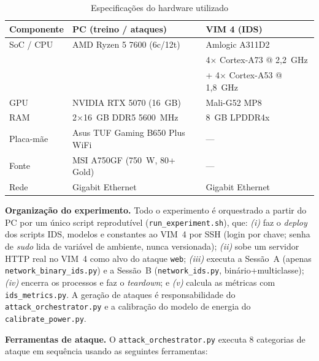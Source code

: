 \documentclass[12pt]{article}
\begin{document}
\begin{table}[ht]
\centering
\caption{Especificações do hardware utilizado}
\label{tab:hardware}
\begin{tabular}{@{}lll@{}}
\toprule
\textbf{Componente} & \textbf{PC (treino / ataques)} & \textbf{VIM 4 (IDS)} \\ \midrule
SoC / CPU & AMD Ryzen 5 7600 (6c/12t) & Amlogic A311D2 \\
          &                            & 4$\times$ Cortex-A73 @ 2,2~GHz \\
          &                            & + 4$\times$ Cortex-A53 @ 1,8~GHz \\
GPU       & NVIDIA RTX 5070 (16~GB)    & Mali-G52 MP8 \\
RAM       & 2$\times$16~GB DDR5 5600~MHz & 8~GB LPDDR4x \\
Placa-mãe & Asus TUF Gaming B650 Plus WiFi & — \\
Fonte     & MSI A750GF (750~W, 80+ Gold) & — \\
Rede      & Gigabit Ethernet           & Gigabit Ethernet \\
\bottomrule
\end{tabular}
\end{table}

\textbf{Organização do experimento.} Todo o experimento é orquestrado a partir do
PC por um único script reprodutível (\texttt{run\_experiment.sh}), que:
\textit{(i)} faz o \textit{deploy} dos scripts IDS, modelos e constantes ao VIM~4
por SSH (login por chave; senha de \textit{sudo} lida de variável de ambiente,
nunca versionada); \textit{(ii)} sobe um servidor HTTP real no VIM~4 como alvo do
ataque \texttt{web}; \textit{(iii)} executa a Sessão~A (apenas
\texttt{network\_binary\_ids.py}) e a Sessão~B (\texttt{network\_ids.py},
binário+multiclasse); \textit{(iv)} encerra os processos e faz o
\textit{teardown}; e \textit{(v)} calcula as métricas com \texttt{ids\_metrics.py}.
A geração de ataques é responsabilidade do \texttt{attack\_orchestrator.py} e a
calibração do modelo de energia do \texttt{calibrate\_power.py}.

\textbf{Ferramentas de ataque.} O \texttt{attack\_orchestrator.py} executa 8
categorias de ataque em sequência usando as seguintes ferramentas:
\end{document}
